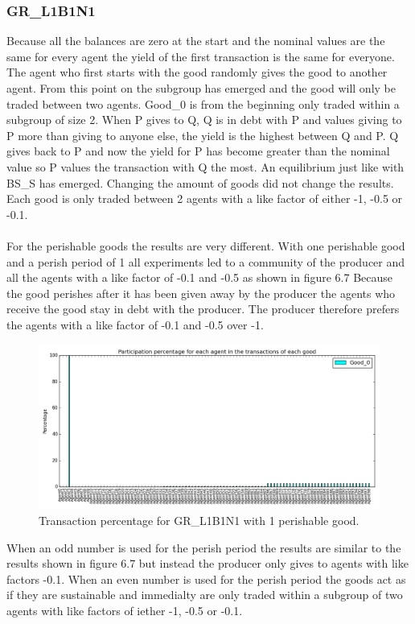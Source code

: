 \documentclass[twoside,openright]{uva-bachelor-thesis}
\begin{document}
\subsubsection{GR\_L1B1N1}
Because all the balances are zero at the start and the nominal values are the same for every agent the yield of the first transaction is the same for everyone. The agent who first starts with the good randomly gives the good to another agent. From this point on the subgroup has emerged and the good will only be traded between two agents. Good\_0 is from the beginning only traded within a subgroup of size 2.  When P gives to Q, Q is in debt with P and values giving to P more than giving to anyone else, the yield is the highest between Q and P. Q gives back to P and now the yield for P has become greater than the nominal value so P values the transaction with Q the most. An equilibrium just like with BS\_S has emerged. Changing the amount of goods did not change the results. Each good is only traded between 2 agents with a like factor of either -1, -0.5 or -0.1.
\\
\\
For the perishable goods the results are very different. With one perishable good and a perish period of 1 all experiments led to a community of the producer and all the agents with a like factor of -0.1 and -0.5 as shown in figure 6.7 Because the good perishes after it has been given away by the producer the agents who receive the good stay in debt with the producer. The producer therefore prefers the agents with a like factor of -0.1 and -0.5 over -1. \\
\begin{figure}[h!]
  \centering
   \includegraphics[scale=0.4]{Simulation_figures/GR_L1B1N1/1perishable_1-1_15k}
  \caption{Transaction percentage for GR\_L1B1N1 with 1 perishable good.}
\end{figure}

When an odd number is used for the perish period the results are similar to the results shown in figure 6.7 but instead the producer only gives to agents with like factors -0.1. When an even number is used for the perish period the goods act as if they are sustainable and immedialty are only traded within a subgroup of two agents with like factors of iether -1, -0.5 or -0.1. 
\end{document}
